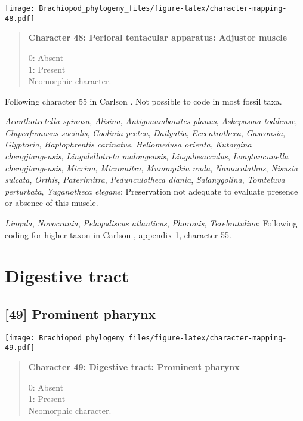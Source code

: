 \documentclass[openany]{book}
\theoremstyle{definition}
\theoremstyle{definition}
\theoremstyle{definition}
\theoremstyle{remark}
\begin{document}
\texttt{[image: Brachiopod\_phylogeny\_files/figure-latex/character-mapping-48.pdf]}

\begin{quote}
\textbf{Character 48: Perioral tentacular apparatus: Adjustor muscle}

0: Absent\\
1: Present\\
Neomorphic character.
\end{quote}

Following character 55 in Carlson
\citeyearpar{Carlson1995Phylogeneticrelationships}. Not possible to code
in most fossil taxa.

\hypertarget{Acanthotretella_spinosa-coding-48}{}
\emph{Acanthotretella spinosa}, \emph{Alisina}, \emph{Antigonambonites
planus}, \emph{Askepasma toddense}, \emph{Clupeafumosus socialis},
\emph{Coolinia pecten}, \emph{Dailyatia}, \emph{Eccentrotheca},
\emph{Gasconsia}, \emph{Glyptoria}, \emph{Haplophrentis carinatus},
\emph{Heliomedusa orienta}, \emph{Kutorgina chengjiangensis},
\emph{Lingulellotreta malongensis}, \emph{Lingulosacculus},
\emph{Longtancunella chengjiangensis}, \emph{Micrina},
\emph{Micromitra}, \emph{Mummpikia nuda}, \emph{Namacalathus},
\emph{Nisusia sulcata}, \emph{Orthis}, \emph{Paterimitra},
\emph{Pedunculotheca diania}, \emph{Salanygolina}, \emph{Tomteluva
perturbata}, \emph{Yuganotheca elegans}: Preservation not adequate to
evaluate presence or absence of this muscle.

\hypertarget{Lingula-coding-48}{}
\emph{Lingula}, \emph{Novocrania}, \emph{Pelagodiscus atlanticus},
\emph{Phoronis}, \emph{Terebratulina}: Following coding for higher taxon
in Carlson \citeyearpar{Carlson1995Phylogeneticrelationships}, appendix
1, character 55.

\section{Digestive tract}\label{digestive-tract}

\subsection*{{[}49{]} Prominent pharynx}\label{prominent-pharynx}

\texttt{[image: Brachiopod\_phylogeny\_files/figure-latex/character-mapping-49.pdf]}

\begin{quote}
\textbf{Character 49: Digestive tract: Prominent pharynx}

0: Absent\\
1: Present\\
Neomorphic character.
\end{quote}
\end{document}
